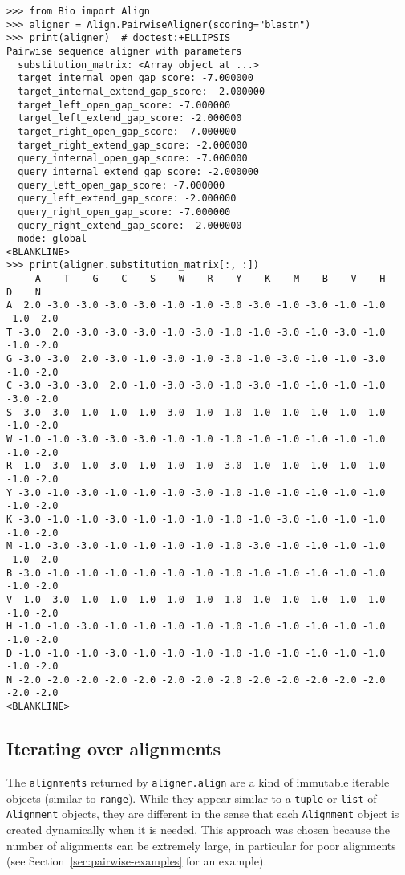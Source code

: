 \begin{verbatim}
>>> from Bio import Align
>>> aligner = Align.PairwiseAligner(scoring="blastn")
>>> print(aligner)  # doctest:+ELLIPSIS
Pairwise sequence aligner with parameters
  substitution_matrix: <Array object at ...>
  target_internal_open_gap_score: -7.000000
  target_internal_extend_gap_score: -2.000000
  target_left_open_gap_score: -7.000000
  target_left_extend_gap_score: -2.000000
  target_right_open_gap_score: -7.000000
  target_right_extend_gap_score: -2.000000
  query_internal_open_gap_score: -7.000000
  query_internal_extend_gap_score: -2.000000
  query_left_open_gap_score: -7.000000
  query_left_extend_gap_score: -2.000000
  query_right_open_gap_score: -7.000000
  query_right_extend_gap_score: -2.000000
  mode: global
<BLANKLINE>
>>> print(aligner.substitution_matrix[:, :])
     A    T    G    C    S    W    R    Y    K    M    B    V    H    D    N
A  2.0 -3.0 -3.0 -3.0 -3.0 -1.0 -1.0 -3.0 -3.0 -1.0 -3.0 -1.0 -1.0 -1.0 -2.0
T -3.0  2.0 -3.0 -3.0 -3.0 -1.0 -3.0 -1.0 -1.0 -3.0 -1.0 -3.0 -1.0 -1.0 -2.0
G -3.0 -3.0  2.0 -3.0 -1.0 -3.0 -1.0 -3.0 -1.0 -3.0 -1.0 -1.0 -3.0 -1.0 -2.0
C -3.0 -3.0 -3.0  2.0 -1.0 -3.0 -3.0 -1.0 -3.0 -1.0 -1.0 -1.0 -1.0 -3.0 -2.0
S -3.0 -3.0 -1.0 -1.0 -1.0 -3.0 -1.0 -1.0 -1.0 -1.0 -1.0 -1.0 -1.0 -1.0 -2.0
W -1.0 -1.0 -3.0 -3.0 -3.0 -1.0 -1.0 -1.0 -1.0 -1.0 -1.0 -1.0 -1.0 -1.0 -2.0
R -1.0 -3.0 -1.0 -3.0 -1.0 -1.0 -1.0 -3.0 -1.0 -1.0 -1.0 -1.0 -1.0 -1.0 -2.0
Y -3.0 -1.0 -3.0 -1.0 -1.0 -1.0 -3.0 -1.0 -1.0 -1.0 -1.0 -1.0 -1.0 -1.0 -2.0
K -3.0 -1.0 -1.0 -3.0 -1.0 -1.0 -1.0 -1.0 -1.0 -3.0 -1.0 -1.0 -1.0 -1.0 -2.0
M -1.0 -3.0 -3.0 -1.0 -1.0 -1.0 -1.0 -1.0 -3.0 -1.0 -1.0 -1.0 -1.0 -1.0 -2.0
B -3.0 -1.0 -1.0 -1.0 -1.0 -1.0 -1.0 -1.0 -1.0 -1.0 -1.0 -1.0 -1.0 -1.0 -2.0
V -1.0 -3.0 -1.0 -1.0 -1.0 -1.0 -1.0 -1.0 -1.0 -1.0 -1.0 -1.0 -1.0 -1.0 -2.0
H -1.0 -1.0 -3.0 -1.0 -1.0 -1.0 -1.0 -1.0 -1.0 -1.0 -1.0 -1.0 -1.0 -1.0 -2.0
D -1.0 -1.0 -1.0 -3.0 -1.0 -1.0 -1.0 -1.0 -1.0 -1.0 -1.0 -1.0 -1.0 -1.0 -2.0
N -2.0 -2.0 -2.0 -2.0 -2.0 -2.0 -2.0 -2.0 -2.0 -2.0 -2.0 -2.0 -2.0 -2.0 -2.0
<BLANKLINE>
\end{verbatim}

\subsection{Iterating over alignments}

The \verb+alignments+ returned by \verb+aligner.align+ are a kind of immutable iterable objects (similar to \verb+range+). While they appear similar to a \verb+tuple+ or \verb+list+ of \verb+Alignment+ objects, they are different in the sense that each \verb+Alignment+ object is created dynamically when it is needed. This approach was chosen because the number of alignments can be extremely large, in particular for poor alignments (see Section~\ref{sec:pairwise-examples} for an example).

